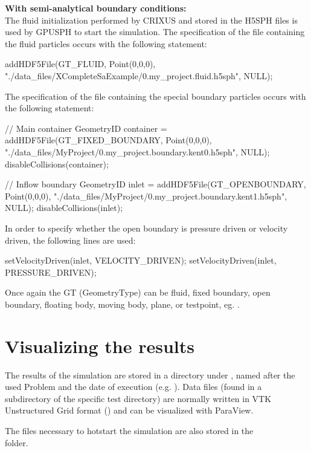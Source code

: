 \textbf{With semi-analytical boundary conditions:}\\

The fluid initialization performed by CRIXUS and stored in the H5SPH 
files is used by GPUSPH to start the simulation. 
The specification of the file containing the fluid particles occurs with the following statement:
\begin{ccode}
addHDF5File(GT_FLUID, Point(0,0,0), 
"./data_files/XCompleteSaExample/0.my_project.fluid.h5sph",
NULL);
\end{ccode}
The specification of the file containing the special boundary particles  occurs with the following statement:\\

\begin{ccode}
  // Main container
  GeometryID container =
  addHDF5File(GT_FIXED_BOUNDARY, Point(0,0,0), 
  "./data_files/MyProject/0.my_project.boundary.kent0.h5sph",
  NULL);
  disableCollisions(container);
  
  // Inflow boundary 
  GeometryID inlet =
  addHDF5File(GT_OPENBOUNDARY, Point(0,0,0), 
  "./data_files/MyProject/0.my_project.boundary.kent1.h5sph",
  NULL);
  disableCollisions(inlet);
\end{ccode}

In order to specify whether the open boundary is pressure driven or velocity driven, the following lines
are used:
\begin{shellcode}
setVelocityDriven(inlet, VELOCITY_DRIVEN);
setVelocityDriven(inlet, PRESSURE_DRIVEN);
\end{shellcode}

Once again the GT (GeometryType) can be fluid, fixed boundary, open boundary, 
floating body, moving body, plane, or testpoint, eg. . 


\section{Visualizing the results}\label{sec:postprocess}

The results of the simulation are stored in a directory under
, named after the used Problem and the date of execution
(e.g. ). Data files (found in a
 subdirectory of the specific test directory) are normally
written in VTK Unstructured Grid format () and can be
visualized with ParaView.

The files necessary to hotstart the simulation are also stored
in the \\  folder.

